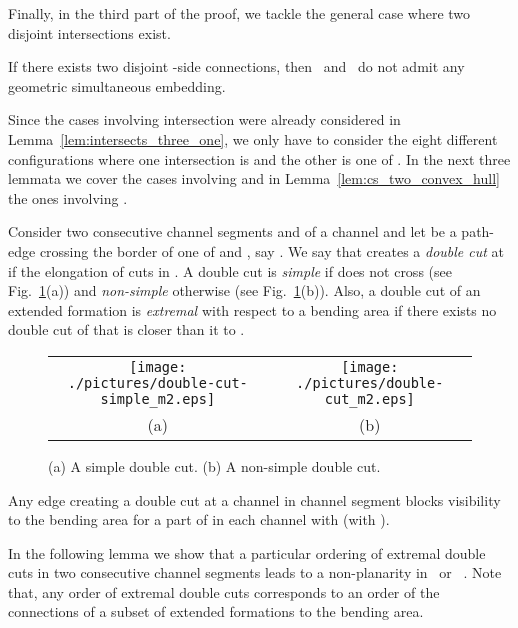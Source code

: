 \documentclass[a4paper,10pt]{llncs}
\newcounter{prop}
\newcommand{\T}{\mbox{ }}
\renewcommand{\P}{\mbox{ }}
\begin{document}
Finally, in the third part of the proof, we tackle the general case where two disjoint intersections exist.

\begin{proposition}\label{prop:disjoint}
If there exists two disjoint -side connections, then \T and \P do not admit any geometric simultaneous embedding.
\end{proposition}

Since the cases involving intersection  were already considered in Lemma~\ref{lem:intersects_three_one}, we only have to consider the eight different configurations where one intersection is  and the other is one of . In the next three lemmata we cover the cases involving  and in Lemma~\ref{lem:cs_two_convex_hull} the ones involving .

Consider two consecutive channel segments  and  of a channel  and let  be a path-edge crossing the border of one of  and , say . We say that  creates a \emph{double cut} at  if the elongation of  cuts  in . A double cut is \emph{simple} if  does not cross  (see Fig.~\ref{fig:double-cut}(a)) and \emph{non-simple} otherwise (see Fig.~\ref{fig:double-cut}(b)). Also, a double cut of an extended formation  is \emph{extremal} with respect to a bending area  if there exists no double cut of  that is closer than it to .

\begin{figure}[htb]
\begin{center}
\begin{tabular}{c c}
\mbox{\texttt{[image: ./pictures/double-cut-simple\_m2.eps]}} \hspace{1.5cm} &
\mbox{\texttt{[image: ./pictures/double-cut\_m2.eps]}} \\
(a) \hspace{1.5cm} & (b)\\
\end{tabular}
\caption{(a) A simple double cut. (b) A non-simple double cut.}
\label{fig:double-cut}
\end{center}
\end{figure}

\begin{property}\label{prop:double-cut}
Any edge  creating a double cut at a channel  in channel segment  blocks visibility to the bending area  for a part of  in each channel  with  (with ).
\end{property}

In the following lemma we show that a particular ordering of extremal double cuts in two consecutive channel segments leads to a non-planarity in \T or \P. Note that, any order of extremal double cuts corresponds to an order of the connections of a subset of extended formations to the bending area.
\end{document}
